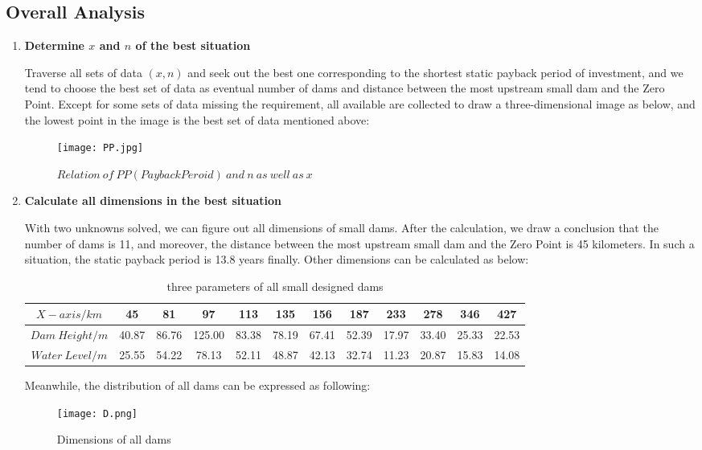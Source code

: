 \documentclass[12pt]{article}%
\begin{document}
\subsection{Overall Analysis}
\begin{enumerate}[1.]
	\item{\textbf{Determine $x$ and $n$ of the best situation}} 
\par\noindent
Traverse all sets of data $(x,n)$ and seek out the best one corresponding to the shortest static payback period of investment, and we tend to choose the best set of data as eventual number of dams and distance between the most upstream small dam and the Zero Point. Except for some sets of data missing the requirement, all available are collected to draw a three-dimensional image as below, and the lowest point in the image is the best set of data mentioned above:
	\begin{figure}[H]
	\centering
	\texttt{[image: PP.jpg]}
	\caption{$Relation\ of\ PP(Payback Peroid)\ and\ n\ as\ well\ as\ x$}
	\label{PP}
	\end{figure}
	\item{\textbf{Calculate all dimensions in the best situation}} 
\par\noindent
With two unknowns solved, we can figure out all dimensions of small dams. After the calculation, we draw a conclusion that the number of dams is 11, and moreover, the distance between the most upstream small dam and the Zero Point is 45 kilometers. In such a situation, the static payback period is 13.8 years finally. Other dimensions can be calculated as below:
	\begin{table}[H]
	\centering
	\footnotesize
	\caption{three parameters of all small designed dams}
	\label{dam}
	\begin{tabular}{|cccccccccccc|}
	\hline
	$X-axis/km$  &  45  &  81  &  97  &  113  &  135  &  156  &  187  &  233  &  278  &  346  &  427\\
	\hline
	$Dam\ Height/m$  &  40.87  &  86.76  &  125.00  &  83.38  &  78.19  &  67.41  &  52.39  &  17.97  &  33.40  &  25.33  &  22.53\\
	\hline
	$Water\ Level/m$  &  25.55  &  54.22  &  78.13  &  52.11  &  48.87  &  42.13  &  32.74  &  11.23  &  20.87  &  15.83  &  14.08\\
	\hline
	\end{tabular}
	\end{table}
Meanwhile, the distribution of all dams can be expressed as following:
	\begin{figure}[H]
	\centering
	\texttt{[image: D.png]}
	\caption{Dimensions of all dams}
	\label{Dimension}
	\end{figure}
\end{enumerate}
\end{document}
